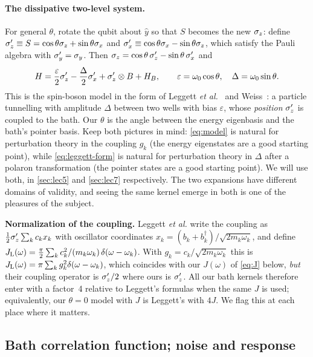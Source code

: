 \paragraph{The dissipative two-level system.}
For general $\theta$, rotate the qubit about $\hat y$ so that $S$ becomes the new $\sigma_z$: define $\sigma_z'\equiv S=\cos\theta\sigma_z+\sin\theta\sigma_x$ and $\sigma_x'\equiv\cos\theta\sigma_x-\sin\theta\sigma_z$, which satisfy the Pauli algebra with $\sigma_y'=\sigma_y$.
Then $\sigma_z=\cos\theta\,\sigma_z'-\sin\theta\,\sigma_x'$ and
\begin{equation}
  H=\frac{\varepsilon}{2}\sigma_z'-\frac{\Delta}{2}\sigma_x'+\sigma_z'\otimes B+H_B,\qquad
  \varepsilon=\omega_0\cos\theta,\quad \Delta=\omega_0\sin\theta .
  \label{eq:leggett-form}
\end{equation}
This is the spin-boson model in the form of Leggett \emph{et al.}~\cite[Sec.~II]{Leggett1987} and Weiss~\cite[Ch.~3]{Weiss2012}: a particle tunnelling with amplitude $\Delta$ between two wells with bias $\varepsilon$, whose \emph{position} $\sigma_z'$ is coupled to the bath.
Our $\theta$ is the angle between the energy eigenbasis and the bath's pointer basis.
Keep both pictures in mind: \cref{eq:model} is natural for perturbation theory in the coupling $g_k$ (the energy eigenstates are a good starting point), while \cref{eq:leggett-form} is natural for perturbation theory in $\Delta$ after a polaron transformation (the pointer states are a good starting point).
We will use both, in \cref{sec:lec5} and \cref{sec:lec7} respectively.
The two expansions have different domains of validity, and seeing the same kernel emerge in both is one of the pleasures of the subject.

\begin{warnbox}
\small\textbf{Normalization of the coupling.}
Leggett \emph{et al.} write the coupling as $\tfrac12\sigma_z'\sum_kc_kx_k$ with oscillator coordinates $x_k=(b_k+b_k^\dagger)/\sqrt{2m_k\omega_k}$, and define $J_{\rm L}(\omega)=\tfrac{\pi}2\sum_kc_k^2/(m_k\omega_k)\,\delta(\omega-\omega_k)$.
With $g_k=c_k/\sqrt{2m_k\omega_k}$ this is $J_{\rm L}(\omega)=\pi\sum_kg_k^2\delta(\omega-\omega_k)$, which coincides with our $J(\omega)$ of \cref{eq:J} below, \emph{but} their coupling operator is $\sigma_z'/2$ where ours is $\sigma_z'$.
All our bath kernels therefore enter with a factor~4 relative to Leggett's formulas when the same $J$ is used; equivalently, our $\theta=0$ model with $J$ is Leggett's with $4J$.
We flag this at each place where it matters.
\end{warnbox}

\subsection{Bath correlation function; noise and response}
\label{sec:bath-kernels}

